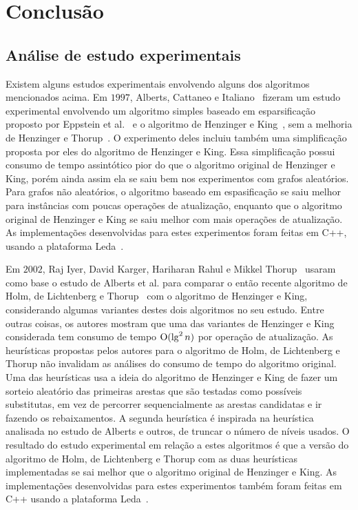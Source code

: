 \chapter{Conclusão}
\label{sec:conclusao}

\section{Análise de estudo experimentais}
\label{sec:conclusao:xp}

Existem alguns estudos experimentais envolvendo alguns dos algoritmos mencionados acima.
Em $1997$, Alberts, Cattaneo e Italiano~\cite{EmpiricalStudy1997} fizeram um estudo experimental envolvendo um algoritmo simples baseado em esparsificação proposto por Eppstein et al.~\cite{Eppstein1992SparsificationaTF} e o algoritmo de Henzinger e King~\cite{HenzingerKing}, sem a melhoria de Henzinger e Thorup~\cite{HenzingerThorup}.
O experimento deles incluiu também uma simplificação proposta por eles do algoritmo de Henzinger e King.
Essa simplificação possui consumo de tempo assintótico pior do que o algoritmo original de Henzinger e King, porém ainda assim ela se saiu bem nos experimentos com grafos aleatórios.
Para grafos não aleatórios, o algoritmo baseado em espasificação se saiu melhor para instâncias com poucas operações de atualização, enquanto que o algoritmo original de Henzinger e King se saiu melhor com mais operações de atualização.
As implementações desenvolvidas para estes experimentos foram feitas em C++, usando a plataforma Leda~\cite{LEDA}.

Em $2002$, Raj Iyer, David Karger, Hariharan Rahul e Mikkel Thorup~\cite{EmpiricalStudy2002} usaram como base o estudo de Alberts et al. para comparar o então recente algoritmo de Holm, de Lichtenberg e Thorup~\cite{poly_log} com o algoritmo de Henzinger e King, considerando algumas variantes destes dois algoritmos no seu estudo.
Entre outras coisas, os autores mostram que uma das variantes de Henzinger e King considerada tem consumo de tempo $\mathrm{O}(\lg^2 n)$ por operação de atualização.
As heurísticas propostas pelos autores para o algoritmo de Holm, de Lichtenberg e Thorup não invalidam as análises do consumo de tempo do algoritmo original.
Uma das heurísticas usa a ideia do algoritmo de Henzinger e King de fazer um sorteio aleatório das primeiras arestas que são testadas como possíveis substitutas, em vez de percorrer sequencialmente as arestas candidatas e ir fazendo os rebaixamentos. A segunda heurística é inspirada na heurística analisada no estudo de Alberts e outros, de truncar o número de níveis usados.
O resultado do estudo experimental em relação a estes algoritmos é que a versão do algoritmo de Holm, de Lichtenberg e Thorup com as duas heurísticas implementadas se sai melhor que o algoritmo original de Henzinger e King.
As implementações desenvolvidas para estes experimentos também foram feitas em C++ usando a plataforma Leda~\cite{LEDA}.

